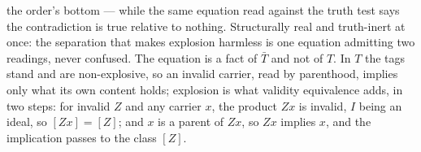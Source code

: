 the order's bottom --- while the same equation read against the truth test says the contradiction is true relative to nothing. Structurally real and truth-inert at once: the separation that makes explosion harmless is one equation admitting two readings, never confused. The equation is a fact of $\bar{T}$ and not of $T$. In $T$ the tags stand and are non-explosive, so an invalid carrier, read by parenthood, implies only what its own content holds; explosion is what validity equivalence adds, in two steps: for invalid $Z$ and any carrier $x$, the product $Zx$ is invalid, $I$ being an ideal, so $[Zx] = [Z]$; and $x$ is a parent of $Zx$, so $Zx$ implies $x$, and the implication passes to the class $[Z]$.
